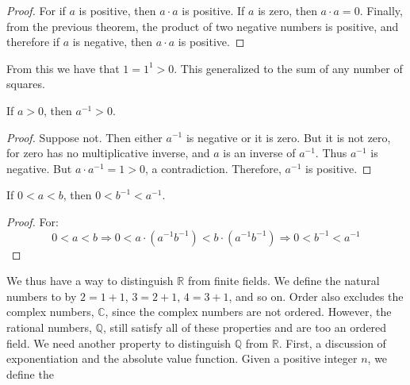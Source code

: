 \documentclass[crop=false,class=book,oneside]{standalone}
\begin{document}
            \begin{proof}
                For if $a$ is positive, then $a\cdot{a}$ is positive.
                If $a$ is zero, then $a\cdot{a}=0$. Finally, from the
                previous theorem, the product of two negative numbers
                is positive, and therefore if $a$ is negative, then
                $a\cdot{a}$ is positive.
            \end{proof}
            From this we have that $1=1^{1}>0$. This generalized to
            the sum of any number of squares.
            \begin{theorem}
                If $a>0$, then $a^{\minus{1}}>0$.
            \end{theorem}
            \begin{proof}
                Suppose not. Then either $a^{\minus{1}}$ is negative
                or it is zero. But it is not zero, for zero has no
                multiplicative inverse, and $a$ is an inverse of
                $a^{\minus{1}}$. Thus $a^{\minus{1}}$ is negative.
                But $a\cdot{a}^{\minus{1}}=1>0$, a contradiction.
                Therefore, $a^{\minus{1}}$ is positive.
            \end{proof}
            \begin{theorem}
                If $0<a<b$, then $0<b^{\minus{1}}<a^{\minus{1}}$.
            \end{theorem}
            \begin{proof}
                For:
                \begin{equation}
                    0<a<b\Longrightarrow
                    0<a\cdot(a^{\minus{1}}b^{\minus{1}})<
                    b\cdot(a^{\minus{1}}b^{\minus{1}})\Longrightarrow
                    0<b^{\minus{1}}<a^{\minus{1}}
                \end{equation}
            \end{proof}
            We thus have a way to distinguish $\mathbb{R}$
            from finite fields. We define the natural numbers to by
            $2=1+1$, $3=2+1$, $4=3+1$, and so on. Order also excludes
            the complex numbers, $\mathbb{C}$, since the complex
            numbers are not ordered. However, the rational numbers,
            $\mathbb{Q}$, still satisfy all of these properties and
            are too an ordered field. We need another property to
            distinguish $\mathbb{Q}$ from $\mathbb{R}$. First, a
            discussion of exponentiation and the absolute value
            function. Given a positive integer $n$, we define the
\end{document}
